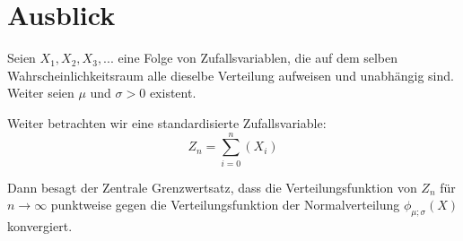 \documentclass[12pt,a4paper,twocolumn]{article}
\begin{document}
\section{Ausblick}
Seien $X_1, X_2, X_3, ...$ eine Folge von Zufallsvariablen, die auf dem selben Wahrscheinlichkeitsraum alle dieselbe Verteilung aufweisen und unabhängig sind. Weiter seien $\mu$ und $\sigma > 0$ existent.

Weiter betrachten wir eine standardisierte Zufallsvariable:
$$ Z_n = \sum_{i = 0}^n(X_i)$$

Dann besagt der Zentrale Grenzwertsatz, dass die Verteilungsfunktion von $Z_n$ für $n \rightarrow \infty$ punktweise gegen die Verteilungsfunktion der Normalverteilung $\phi_{\mu;\sigma}(X)$ konvergiert. 


\onecolumn
\pagebreak
\end{document}
